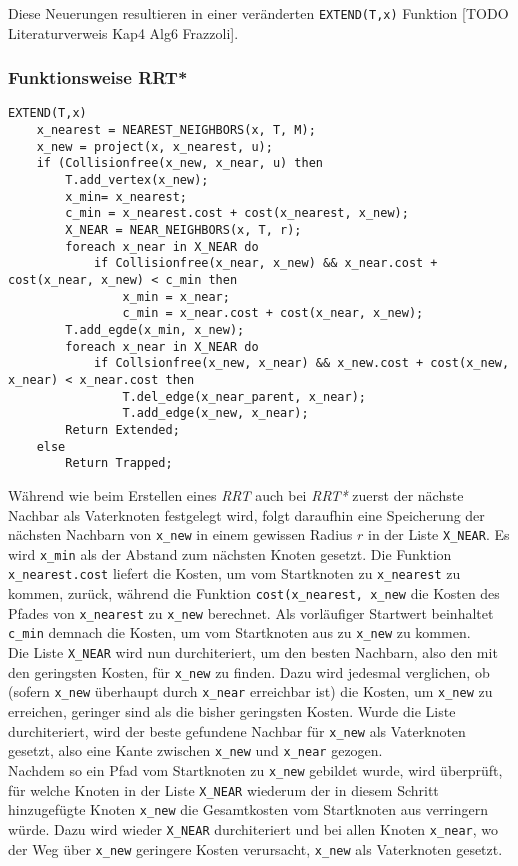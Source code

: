 Diese Neuerungen resultieren in einer veränderten \verb|EXTEND(T,x)| Funktion [TODO Literaturverweis Kap4 Alg6 Frazzoli].
\subsubsection{Funktionsweise RRT*}
\begin{lstlisting}
EXTEND(T,x)
	x_nearest = NEAREST_NEIGHBORS(x, T, M);
	x_new = project(x, x_nearest, u);
	if (Collisionfree(x_new, x_near, u) then
		T.add_vertex(x_new);
		x_min= x_nearest;
		c_min = x_nearest.cost + cost(x_nearest, x_new);
		X_NEAR = NEAR_NEIGHBORS(x, T, r);
		foreach x_near in X_NEAR do
			if Collisionfree(x_near, x_new) && x_near.cost + cost(x_near, x_new) < c_min then
				x_min = x_near;
				c_min = x_near.cost + cost(x_near, x_new);
		T.add_egde(x_min, x_new);
		foreach x_near in X_NEAR do
			if Collsionfree(x_new, x_near) && x_new.cost + cost(x_new, x_near) < x_near.cost then
				T.del_edge(x_near_parent, x_near);
				T.add_edge(x_new, x_near);
		Return Extended;
	else
		Return Trapped;
\end{lstlisting}

Während wie beim Erstellen eines \textit{RRT} auch bei \textit{RRT*} zuerst der nächste Nachbar als Vaterknoten festgelegt wird, folgt daraufhin eine Speicherung der nächsten Nachbarn von \verb|x_new| in einem gewissen Radius $r$ in der Liste \verb|X_NEAR|. 
Es wird \verb|x_min| als der Abstand zum nächsten Knoten gesetzt. Die Funktion \verb|x_nearest.cost| liefert die Kosten, um vom Startknoten zu \verb|x_nearest| zu kommen, zurück, während die Funktion \verb|cost(x_nearest, x_new| die Kosten des Pfades von \verb|x_nearest| zu \verb|x_new| berechnet. Als vorläufiger Startwert beinhaltet \verb|c_min| demnach die Kosten, um vom Startknoten aus zu \verb|x_new| zu kommen. \\
Die Liste \verb|X_NEAR| wird nun durchiteriert, um den besten Nachbarn, also den mit den geringsten Kosten, für \verb|x_new| zu finden. Dazu wird jedesmal verglichen, ob (sofern \verb|x_new| überhaupt durch \verb|x_near| erreichbar ist) die Kosten, um \verb|x_new| zu erreichen, geringer sind als die bisher geringsten Kosten. Wurde die Liste durchiteriert, wird der beste gefundene Nachbar für \verb|x_new| als Vaterknoten gesetzt, also eine Kante zwischen \verb|x_new| und \verb|x_near| gezogen. \\
Nachdem so ein Pfad vom Startknoten zu \verb|x_new| gebildet wurde, wird überprüft, für welche Knoten in der Liste \verb|X_NEAR| wiederum der in diesem Schritt hinzugefügte Knoten \verb|x_new| die Gesamtkosten vom Startknoten aus verringern würde. Dazu wird wieder \verb|X_NEAR| durchiteriert und bei allen Knoten \verb|x_near|, wo der Weg über \verb|x_new| geringere Kosten verursacht, \verb|x_new| als Vaterknoten gesetzt.
